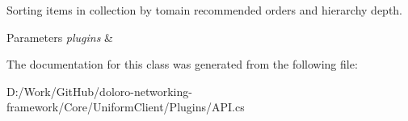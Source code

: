 Sorting items in collection by tomain recommended orders and hierarchy depth. 


\begin{DoxyParams}{Parameters}
{\em plugins} & \\
\hline
\end{DoxyParams}


The documentation for this class was generated from the following file\+:\begin{DoxyCompactItemize}
\item 
D\+:/\+Work/\+Git\+Hub/doloro-\/networking-\/framework/\+Core/\+Uniform\+Client/\+Plugins/A\+P\+I.\+cs\end{DoxyCompactItemize}
